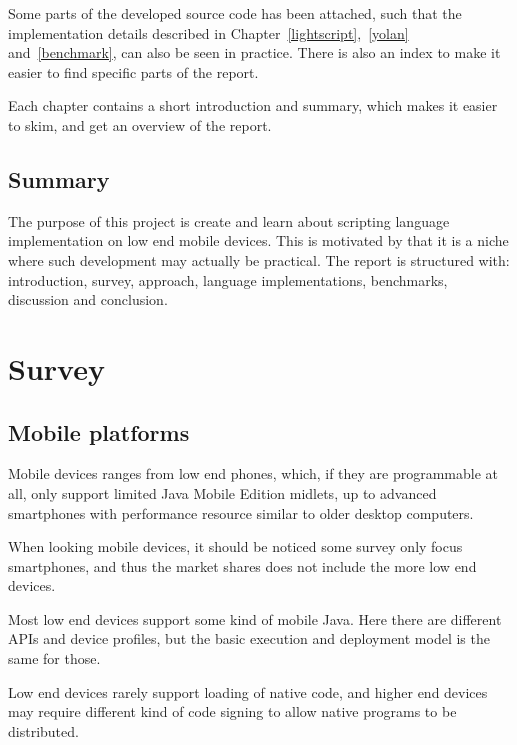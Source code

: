 \documentclass[11pt]{report}
\begin{document}
Some parts of the developed source code has been attached, such that the implementation details described in Chapter~\ref{lightscript},~\ref{yolan} and~\ref{benchmark}, can also be seen in practice.
There is also an index to make it easier to find specific parts of the report.

Each chapter contains a short introduction and summary, which makes it easier to skim, and get an overview of the report.

\section{Summary}
The purpose of this project is create and learn about scripting language implementation on low end mobile devices.
This is motivated by that it is a niche where such development may actually be practical.
The report is structured with: introduction, survey, approach, language implementations, benchmarks, discussion and conclusion.

\chapter{Survey}
\label{survey}

\section{Mobile platforms}

Mobile devices ranges from low end phones, which, if they are programmable at all, only support limited Java Mobile Edition midlets, up to advanced smartphones with performance resource similar to older desktop computers.

When looking mobile devices, it should be noticed some survey \cite{smartphonesurvey} only focus smartphones, and thus the market shares does not include the more low end devices.

Most low end devices support some kind of mobile Java.
Here there are different APIs and device profiles, but the basic execution and deployment model is the same for those.

Low end devices rarely support loading of native code, and higher end devices may require different kind of code signing to allow native programs to be distributed.
\end{document}
